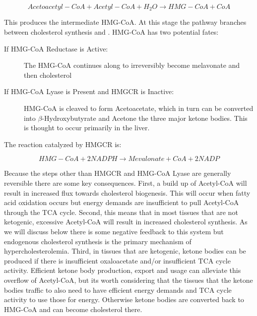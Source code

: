 \documentclass{tufte-handout}
\begin{document}
\begin{equation}\label{eq:hmgcs}
Acetoacetyl-CoA + Acetyl-CoA + H_2O \rightarrow HMG-CoA + CoA
\end{equation}

This produces the intermediate HMG-CoA.  At this stage the pathway branches between cholesterol synthesis and .  HMG-CoA has two potential fates:
\begin{description}
\item [If HMG-CoA Reductase is Active:] The HMG-CoA continues along to irreversibly become melavonate and then cholesterol
\item [If HMG-CoA Lyase is Present and HMGCR is Inactive:] HMG-CoA is cleaved to form Acetoacetate, which in turn can be converted into $\beta$-Hydroxybutyrate and Acetone the three major ketone bodies.  This is thought to occur primarily in the liver.
\end{description}

The reaction catalyzed by HMGCR is:

\begin{equation}\label{eq:hmgcs}
HMG-CoA + 2NADPH \rightarrow Mevalonate + CoA + 2NADP
\end{equation}

 Because the steps other than HMGCR and HMG-CoA Lyase are generally reversible there are some key consequences.  First, a build up of Acetyl-CoA will result in increased flux towards cholesterol biogenesis.  This will occur when fatty acid oxidation occurs but energy demands are insufficient to pull Acetyl-CoA through the TCA cycle.  Second, this means that in most tissues that are not ketogenic, excessive Acetyl-CoA will result in increased cholesterol synthesis.  As we will discuss below there is some negative feedback to this system but endogenous cholesterol synthesis is the primary mechanism of hypercholesterolemia.  Third, in tissues that are ketogenic, ketone bodies can be produced if there is insufficient oxaloacetate and/or insufficient TCA cycle activity.  Efficient ketone body production, export and usage can alleviate this overflow of Acetyl-CoA, but its worth considering that the tissues that the ketone bodies traffic to also need to have efficient energy demands and TCA cycle activity to use those for energy.  Otherwise ketone bodies are converted back to HMG-CoA and can become cholesterol there.
\end{document}
